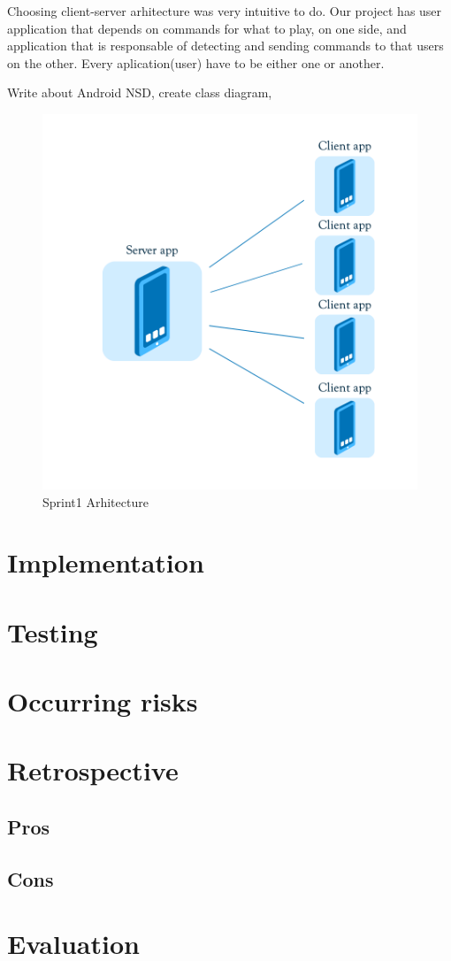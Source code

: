 Choosing client-server arhitecture was very intuitive to do.
Our project has user application that depends on commands for what to play, on one side, and application that is responsable of detecting and sending commands to that users on the other.
Every aplication(user) have to be either one or another. 

Write about Android NSD, create class diagram, 


\begin{figure}[!t]
	\centering
		\includegraphics[width=16cm]{sprint1/arhitecture.png}
	\caption{Sprint1 Arhitecture}
	\label{fig:sprint1_arhitecture}
\end{figure}

\section{Implementation}
\section{Testing}
\section{Occurring risks}
\section{Retrospective}
\subsection{Pros}
\subsection{Cons}
\section{Evaluation}